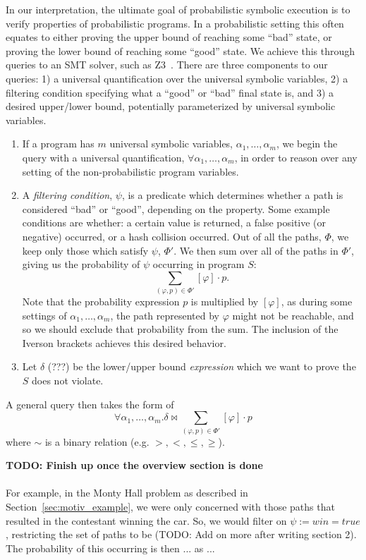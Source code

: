 \documentclass[acmsmall,review]{acmart}\settopmatter{}
\begin{document}
	
	In our interpretation, the ultimate goal of probabilistic symbolic execution is to verify properties of probabilistic programs.
	In a probabilistic setting this often equates to either proving the upper bound of reaching some ``bad'' state, or proving the lower bound of reaching some ``good'' state.
	We achieve this through queries to an SMT solver, such as Z3~\cite{demoura2008}.
	There are three components to our queries: 1) a universal quantification over the universal symbolic variables, 2) a filtering condition specifying what a ``good'' or ``bad'' final state is, and 3) a desired upper/lower bound, potentially parameterized by universal symbolic variables.
	\begin{enumerate}
		\item If a program has $m$ universal symbolic variables, $\alpha_1,\ldots,\alpha_m$, we begin the query with a universal quantification, $\forall \alpha_1,\ldots,\alpha_m$, in order to reason over any setting of the non-probabilistic program variables.
		\item A \textit{filtering condition}, $\psi$, is a predicate which determines whether a path is considered ``bad'' or ``good'', depending on the property.
		Some example conditions are whether: a certain value is returned, a false positive (or negative) occurred, or a hash collision occurred.
		Out of all the paths, $\Phi$, we keep only those which satisfy $\psi$, $\Phi'$.
		We then sum over all of the paths in $\Phi'$, giving us the probability of $\psi$ occurring in program $S$:
		\[
		\sum_{(\varphi,p) \in \Phi'} [\varphi]\cdot p.
		\]
		Note that the probability expression $p$ is multiplied by $[\varphi]$, as during some settings of $\alpha_1,\ldots,\alpha_m$, the path represented by $\varphi$ might not be reachable, and so we should exclude that probability from the sum.
		The inclusion of the Iverson brackets achieves this desired behavior.
		\item Let $\delta$ (???) be the lower/upper bound \textit{expression} which we want to prove the $S$ does not violate.
	\end{enumerate}
	A general query then takes the form of
	\[
	\forall \alpha_1,\ldots,\alpha_m . \displaystyle \delta \bowtie \sum_{(\varphi,p) \in \Phi'} [\varphi]\cdot p 
	\]
	where $\sim$ is a binary relation (e.g. $>,<,\leq,\geq$).
	
	
	{\color{blue} \textbf{TODO: Finish up once the overview section is done}\\\\
		For example, in the Monty Hall problem as described in Section~\ref{sec:motiv_example}, we were only concerned with those paths that resulted in the contestant winning the car.
		So, we would filter on $\psi := win = true$, restricting the set of paths to be (TODO: Add on more after writing section 2).
		The probability of this occurring is then ... as ...
	}
	
\end{document}
